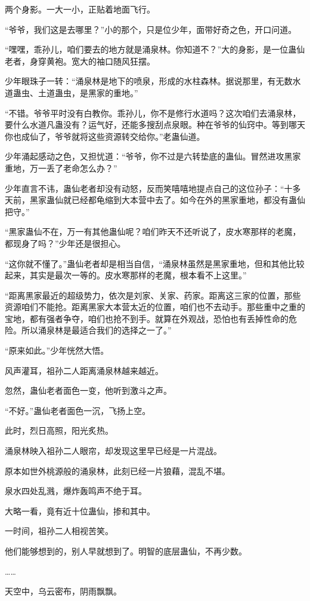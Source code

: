 \begin{this_body}
两个身影。一大一小，正贴着地面飞行。

“爷爷，我们这是去哪里？”小的那个，只是位少年，面带好奇之色，开口问道。

“嘿嘿，乖孙儿，咱们要去的地方就是涌泉林。你知道不？”大的身影，是一位蛊仙老者，身穿黄袍。宽大的袖口随风狂摆。

少年眼珠子一转：“涌泉林是地下的喷泉，形成的水柱森林。据说那里，有无数水道蛊虫、土道蛊虫，是黑家的重地。”

“不错。爷爷平时没有白教你。乖孙儿，你不是修行水道吗？这次咱们去涌泉林，要什么水道凡蛊没有？运气好，还能多搜刮点泉眼。种在爷爷的仙窍中。等到哪天你也成仙了，爷爷就将这些资源转交给你。”老蛊仙道。

少年涌起感动之色，又担忧道：“爷爷，你不过是六转垫底的蛊仙。冒然进攻黑家重地，万一丢了老命怎么办？”

少年直言不讳，蛊仙老者却没有动怒，反而笑嘻嘻地提点自己的这位孙子：“十多天前，黑家蛊仙就已经都龟缩到大本营中去了。如今在外的黑家重地，都没有蛊仙把守。”

“黑家蛊仙不在，万一有其他蛊仙呢？咱们昨天不还听说了，皮水寒那样的老魔，都现身了吗？”少年还是很担心。

“这你就不懂了。”蛊仙老者却是相当自信，“涌泉林虽然是黑家重地，但和其他比较起来，其实是最次一等的。皮水寒那样的老魔，根本看不上这里。”

“距离黑家最近的超级势力，依次是刘家、关家、药家。距离这三家的位置，那些资源咱们不能抢。距离黑家大本营太近的位置，咱们也不去动手。那些重中之重的宝地，都有强者争夺，咱们也抢不到手。就算在外观战，恐怕也有丢掉性命的危险。所以涌泉林是最适合我们的选择之一了。”

“原来如此。”少年恍然大悟。

风声灌耳，祖孙二人距离涌泉林越来越近。

忽然，蛊仙老者面色一变，他听到激斗之声。

“不好。”蛊仙老者面色一沉，飞扬上空。

此时，烈日高照，阳光炙热。

涌泉林映入祖孙二人眼帘，却发现这里早已经是一片混战。

原本如世外桃源般的涌泉林，此刻已经一片狼藉，混乱不堪。

泉水四处乱溅，爆炸轰鸣声不绝于耳。

大略一看，竟有近十位蛊仙，掺和其中。

一时间，祖孙二人相视苦笑。

他们能够想到的，别人早就想到了。明智的底层蛊仙，不再少数。

……

天空中，乌云密布，阴雨飘飘。


\end{this_body}
